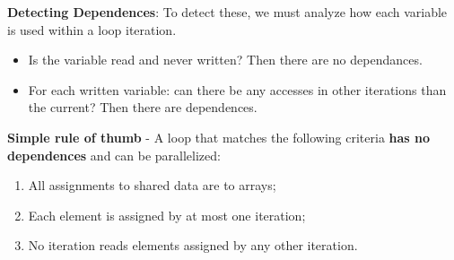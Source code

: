 \par \textbf{Detecting Dependences}: To detect these, we must analyze how each variable is used within a loop iteration.
\begin{itemize}
    \item Is the variable read and never written? Then there are no dependances.
    \item For each written variable: can there be any accesses in other iterations than the current? Then there are dependences.
\end{itemize}
\par \textbf{Simple rule of thumb} - A loop that matches the following criteria \textbf{has no dependences} and can be parallelized:
\begin{enumerate}
    \item All assignments to shared data are to arrays;
    \item Each element is assigned by at most one iteration;
    \item No iteration reads elements assigned by any other iteration.
\end{enumerate}
